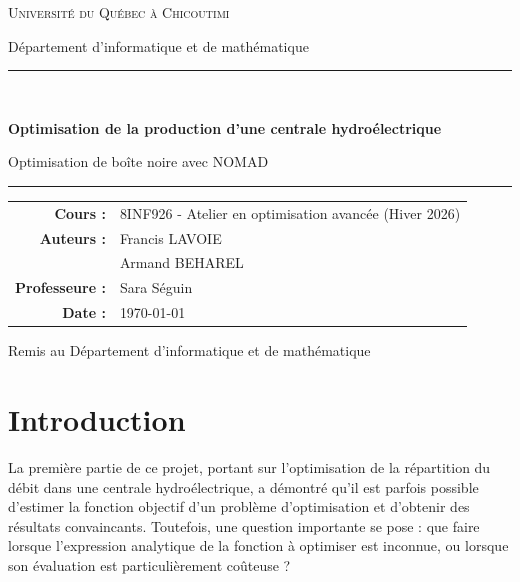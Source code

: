\documentclass[12pt, letterpaper]{report}
\begin{document}
\begin{titlepage}
  \centering
  \vspace*{2cm}

  {\Large\scshape Université du Québec à Chicoutimi\par}
  \vspace{0.4cm}
  {\normalsize Département d'informatique et de mathématique\par}

  \vspace{2.5cm}

  \rule{\linewidth}{0.6pt}\\[0.6em]
  {\LARGE\bfseries\color{accent} Optimisation de la production d'une centrale hydroélectrique\par}
  \vspace{0.3em}
  {\large Optimisation de boîte noire avec NOMAD\par}
  \rule{\linewidth}{0.6pt}

  \vspace{2cm}

  \begin{tabular}{rl}
    \textbf{Cours :} & 8INF926 - Atelier en optimisation avancée (Hiver 2026) \\[4pt]
    \textbf{Auteurs :} & Francis LAVOIE \\
                       & Armand BEHAREL \\[4pt]
    \textbf{Professeure :} & Sara Séguin \\[8pt]
    \textbf{Date :} & \today \\
  \end{tabular}

  \vfill

  {\small\textcolor{codegray}{Remis au Département d'informatique et de mathématique}}

\end{titlepage}
\tableofcontents
\newpage

\chapter{Introduction}

La première partie de ce projet, portant sur l'optimisation de la répartition du débit dans une centrale hydroélectrique, a démontré qu'il est parfois possible d'estimer la fonction objectif d'un problème d'optimisation et d'obtenir des résultats convaincants. Toutefois, une question importante se pose : que faire lorsque l'expression analytique de la fonction à optimiser est inconnue, ou lorsque son évaluation est particulièrement coûteuse ?
\end{document}
